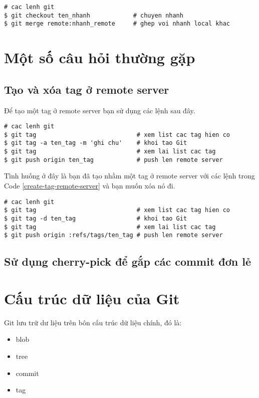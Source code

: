 \documentclass[12pt]{article}
\begin{document}
\begin{lstlisting}[label=ghep-nhanh-merge-remote-branch,caption=Ghép nhánh remote]
# cac lenh git
$ git checkout ten_nhanh            # chuyen nhanh
$ git merge remote:nhanh_remote     # ghep voi nhanh local khac
\end{lstlisting}


\section{Một số câu hỏi thường gặp}
\subsection{Tạo và xóa tag ở remote server}
Để tạo một tag ở remote server bạn sử dụng các lệnh sau đây.

\begin{lstlisting}[label=create-tag-remote-server,caption=Tạo tag ở remote server]
# cac lenh git
$ git tag                            # xem list cac tag hien co
$ git tag -a ten_tag -m 'ghi chu'    # khoi tao Git
$ git tag                            # xem lai list cac tag 
$ git push origin ten_tag            # push len remote server
\end{lstlisting}

Tình huống ở đây là bạn đã tạo nhầm một tag ở remote server với các lệnh trong Code \ref{create-tag-remote-server} và bạn muốn xóa nó đi.

\begin{lstlisting}[label=delete-tag-remote-server,caption=Xóa tag ở remote server]
# cac lenh git
$ git tag                            # xem list cac tag hien co
$ git tag -d ten_tag                 # khoi tao Git
$ git tag                            # xem lai list cac tag 
$ git push origin :refs/tags/ten_tag # push len remote server
\end{lstlisting}

\subsection{Sử dụng cherry-pick để gắp các commit đơn lẻ}

\section{Cấu trúc dữ liệu của Git}
Git lưu trữ dư liệu trên bôn cấu trúc dữ liệu chính, đó là:
\begin{itemize}
\item blob
\item tree
\item commit
\item tag
\end{itemize}
\end{document}

